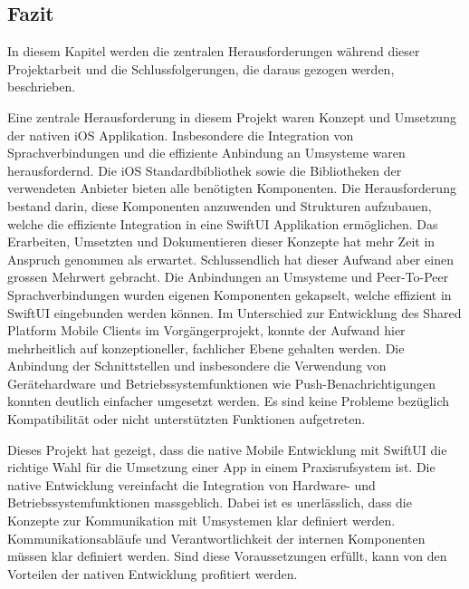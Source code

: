\subsection{Fazit}

In diesem Kapitel werden die zentralen Herausforderungen während dieser Projektarbeit und die Schlussfolgerungen, die daraus gezogen werden, beschrieben.

Eine zentrale Herausforderung in diesem Projekt waren Konzept und Umsetzung der nativen iOS Applikation.
Insbesondere die Integration von Sprachverbindungen und die effiziente Anbindung an Umsysteme waren herausfordernd.
Die iOS Standardbibliothek sowie die Bibliotheken der verwendeten Anbieter bieten alle benötigten Komponenten.
Die Herausforderung bestand darin, diese Komponenten anzuwenden und Strukturen aufzubauen, welche die effiziente Integration in eine SwiftUI Applikation ermöglichen.
Das Erarbeiten, Umsetzten und Dokumentieren dieser Konzepte hat mehr Zeit in Anspruch genommen als erwartet.
Schlussendlich hat dieser Aufwand aber einen grossen Mehrwert gebracht.
Die Anbindungen an Umsysteme und Peer-To-Peer Sprachverbindungen wurden eigenen Komponenten gekapselt, welche effizient in SwiftUI eingebunden werden können.
Im Unterschied zur Entwicklung des Shared Platform Mobile Clients im Vorgängerprojekt, konnte der Aufwand hier mehrheitlich auf konzeptioneller, fachlicher Ebene gehalten werden.
Die Anbindung der Schnittstellen und insbesondere die Verwendung von Gerätehardware und Betriebssystemfunktionen wie Push-Benachrichtigungen konnten deutlich einfacher umgesetzt werden.
Es sind keine Probleme bezüglich Kompatibilität oder nicht unterstützten Funktionen aufgetreten.

Dieses Projekt hat gezeigt, dass die native Mobile Entwicklung mit SwiftUI die richtige Wahl für die Umsetzung einer App in einem Praxisrufsystem ist.
Die native Entwicklung vereinfacht die Integration von Hardware- und Betriebssystemfunktionen massgeblich.
Dabei ist es unerlässlich, dass die Konzepte zur Kommunikation mit Umsystemen klar definiert werden.
Kommunikationsabläufe und Verantwortlichkeit der internen Komponenten müssen klar definiert werden.
Sind diese Voraussetzungen erfüllt, kann von den Vorteilen der nativen Entwicklung profitiert werden.

